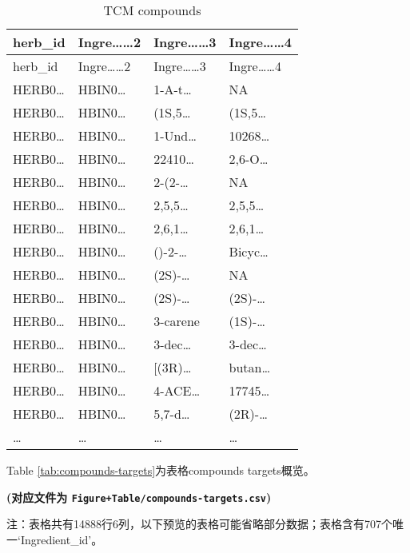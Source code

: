 \documentclass[
]{article}
\begin{document}
\begin{longtable}[]{@{}llll@{}}
\caption{\label{tab:TCM-compounds}TCM compounds}\tabularnewline
\toprule\noalign{}
herb\_id & Ingre\ldots\ldots2 & Ingre\ldots\ldots3 & Ingre\ldots\ldots4 \\
\midrule\noalign{}
\endfirsthead
\toprule\noalign{}
herb\_id & Ingre\ldots\ldots2 & Ingre\ldots\ldots3 & Ingre\ldots\ldots4 \\
\midrule\noalign{}
\endhead
\bottomrule\noalign{}
\endlastfoot
HERB0\ldots{} & HBIN0\ldots{} & 1-A-t\ldots{} & NA \\
HERB0\ldots{} & HBIN0\ldots{} & (1S,5\ldots{} & (1S,5\ldots{} \\
HERB0\ldots{} & HBIN0\ldots{} & 1-Und\ldots{} & 10268\ldots{} \\
HERB0\ldots{} & HBIN0\ldots{} & 22410\ldots{} & 2,6-O\ldots{} \\
HERB0\ldots{} & HBIN0\ldots{} & 2-(2-\ldots{} & NA \\
HERB0\ldots{} & HBIN0\ldots{} & 2,5,5\ldots{} & 2,5,5\ldots{} \\
HERB0\ldots{} & HBIN0\ldots{} & 2,6,1\ldots{} & 2,6,1\ldots{} \\
HERB0\ldots{} & HBIN0\ldots{} & ()-2-\ldots{} & Bicyc\ldots{} \\
HERB0\ldots{} & HBIN0\ldots{} & (2S)-\ldots{} & NA \\
HERB0\ldots{} & HBIN0\ldots{} & (2S)-\ldots{} & (2S)-\ldots{} \\
HERB0\ldots{} & HBIN0\ldots{} & 3-carene & (1S)-\ldots{} \\
HERB0\ldots{} & HBIN0\ldots{} & 3-dec\ldots{} & 3-dec\ldots{} \\
HERB0\ldots{} & HBIN0\ldots{} & {[}(3R)\ldots{} & butan\ldots{} \\
HERB0\ldots{} & HBIN0\ldots{} & 4-ACE\ldots{} & 17745\ldots{} \\
HERB0\ldots{} & HBIN0\ldots{} & 5,7-d\ldots{} & (2R)-\ldots{} \\
\ldots{} & \ldots{} & \ldots{} & \ldots{} \\
\end{longtable}

Table \ref{tab:compounds-targets}为表格compounds targets概览。

\textbf{(对应文件为 \texttt{Figure+Table/compounds-targets.csv})}

\begin{center}\begin{tcolorbox}[colback=gray!10, colframe=gray!50, width=0.9\linewidth, arc=1mm, boxrule=0.5pt]注：表格共有14888行6列，以下预览的表格可能省略部分数据；表格含有707个唯一`Ingredient\_id'。
\end{tcolorbox}
\end{center}
\end{document}
